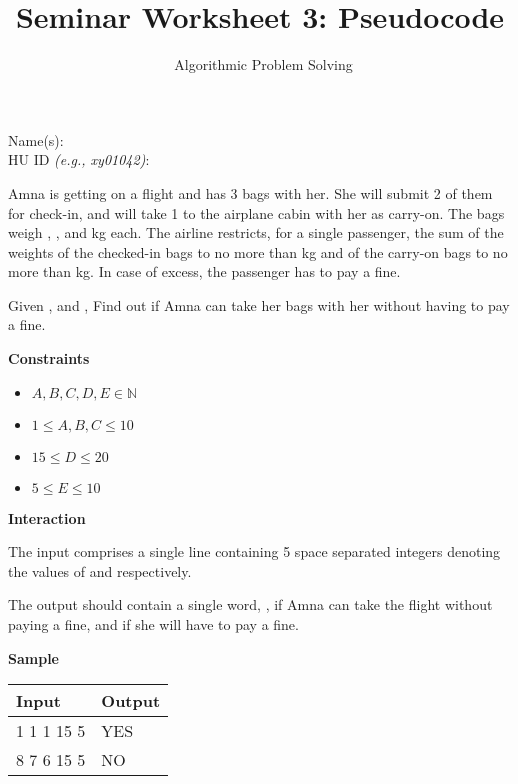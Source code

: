 \documentclass[a4paper]{exam}
\title{Seminar Worksheet 3: Pseudocode}
\author{\class\ Algorithmic Problem Solving}
\date{\term}
\newcommand\heading[1]{\textbf{#1}}
\newcommand\inn{\in \mathbb{N}}
\begin{document}
\maketitle

Name(s): \hrulefill\\[5pt]
HU ID \textit{\small(e.g., xy01042)}: \hrulefill\\

\begin{questions}

    Amna is getting on a flight and has 3 bags with her. She will submit 2 of them for check-in, and will take 1 to the airplane cabin with her as carry-on. The bags weigh , , and  kg each. The airline restricts, for a single passenger, the sum of the weights of the checked-in bags to no more than  kg and of the carry-on bags to no more than  kg. In case of excess, the passenger has to pay a fine.

    Given , and , Find out if Amna can take her bags with her without having to pay a fine.

    \heading{Constraints}
    \begin{itemize}
        \item $A,B,C,D,E \inn$
        \item $1 \le A,B,C \le 10$
        \item $15 \le D \le 20$
        \item $5\le E \le 10$
    \end{itemize}

    \heading{Interaction}

    The input comprises a single line containing 5 space separated integers denoting the values of  and  respectively.

    The output should contain a single word, , if Amna can take the flight without paying a fine, and  if she will have to pay a fine.

    \heading{Sample}

    \begin{tabularx}{\textwidth}{|X|X|}
        \rowcolor{gray!50}
        \hline
        Input      & Output \\ \hline\hline
        1 1 1 15 5 & YES    \\\hline
        8 7 6 15 5 & NO     \\\hline
    \end{tabularx}


\end{questions}
\end{document}
